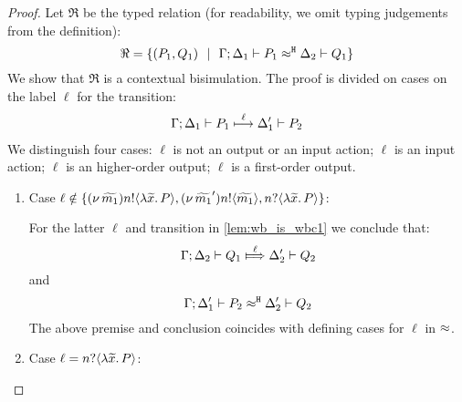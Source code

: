 \begin{proof}
	Let $\Re$ be the typed relation (for readability, we omit typing judgements from the definition):
	\[
		\Re = \{(P_1, Q_1) \ \ |\ \  \Gamma; \Delta_1 \vdash P_1 \approx^\mathtt{H} \Delta_2 \vdash Q_1\}
	\]
	We show that $\Re$ is a contextual bisimulation.
	The proof is divided on cases on the label $\ell$ for the transition:
%
	\begin{eqnarray}
		\Gamma; \Delta_1 \vdash P_1 \stackrel{\ell}{\longmapsto} \Delta_1' \vdash P_2
		\label{lem:wb_is_wbc1}
	\end{eqnarray}
%
We distinguish four cases: $\ell$ is not an output or an input action; $\ell$ is an input action;
$\ell$ is an higher-order output; $\ell$ is a first-order output.
	\begin{enumerate}
		\item
				Case $\ell \notin \{ (\nu\, \widetilde{m_1}) n ! \langle \lambda \widetilde{x}.\,P \rangle,  (\nu\, \widetilde{m_1}') n ! \langle \widetilde{m_1} \rangle, n ? \langle \lambda \widetilde{x}.\,P \rangle \}$:

				\noi For the latter $\ell$ and transition in \eqref{lem:wb_is_wbc1} we conclude that:	
				\[
					\horel{\Gamma}{\Delta_2}{Q_1}{\Hby{\ell}}{\Delta_2'}{Q_2}
				\]
				\noi and
				\[
					\Gamma; \Delta_1' \vdash P_2 \approx^\mathtt{H} \Delta_2' \vdash Q_2
				\]
				The above premise and conclusion coincides with defining cases for $\ell$ in $\approx$.

		\item	Case $\ell = n ? \langle \lambda \widetilde{x}.\,P \rangle$:


\end{enumerate}
\end{proof}
